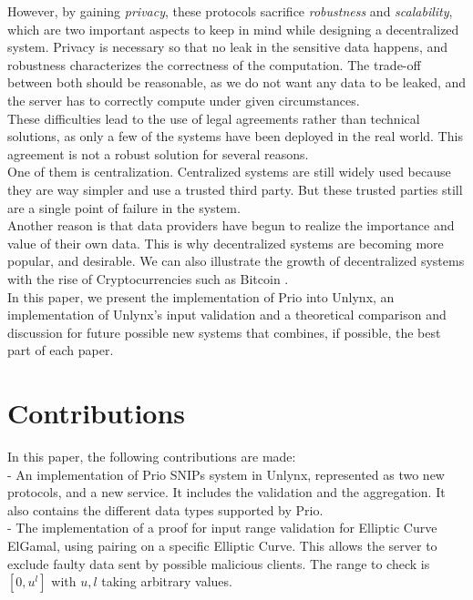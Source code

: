 \documentclass{article}
\begin{document}
However, by gaining \textit{privacy}, these protocols sacrifice \textit{robustness} and \textit{scalability}, which are two important aspects to keep in mind while designing a decentralized system. Privacy is necessary so that no leak in the sensitive data happens, and robustness characterizes the correctness of the computation. The trade-off between both should be reasonable, as we do not want any data to be leaked, and the server has to correctly compute under given circumstances.\\
These difficulties lead to the use of legal agreements rather than technical solutions, as only a few of the systems have been deployed in the real world. This agreement is not a robust solution for several reasons.\\
One of them is centralization. Centralized systems are still widely used \cite{dyadic, centralized} because they are way simpler and use a trusted third party. But these trusted parties still are a single point of failure in the system.\\
Another reason is that data providers have begun to realize the importance and value of their own data.
This is why decentralized systems are becoming more popular, and desirable. We can also illustrate the growth of decentralized systems with the rise of Cryptocurrencies such as Bitcoin \cite{bitcoin}.\\
In this paper, we present the implementation of Prio into Unlynx, an implementation of Unlynx's input validation and a theoretical comparison and discussion for future possible new systems that combines, if possible, the best part of each paper.
	
\section*{Contributions}
In this paper, the following contributions are made:\\
- An implementation of Prio SNIPs system in Unlynx, represented as two new protocols, and a new service. It includes the validation and the aggregation. It also contains the different data types supported by Prio.\\

- The implementation of a proof for input range validation for Elliptic Curve ElGamal, using pairing on a specific Elliptic Curve. This allows the server to exclude faulty data sent by possible malicious clients. The range to check is $[0,u^l]$ with $u,l$ taking arbitrary values.\\
\end{document}
